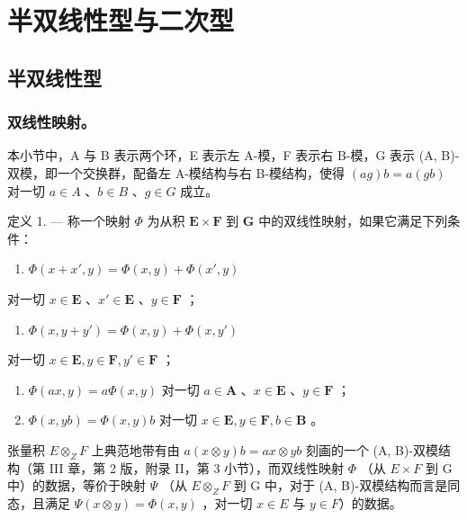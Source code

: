 \chapter{半双线性型与二次型}

\section{半双线性型}

\subsection{双线性映射。}

本小节中，A 与 B 表示两个环，E 表示左 A-模，F 表示右 B-模，G 表示 (A, B)-双模，即一个交换群，配备左 A-模结构与右 B-模结构，使得 \((ag)b = a(gb)\) 对一切 \(a \in A\) 、\(b \in B\) 、\(g \in G\) 成立。

定义 1. --- 称一个映射 \(\Phi\) 为从积 \(\mathbf{E} \times \mathbf{F}\) 到 \(\mathbf{G}\) 中的双线性映射，如果它满足下列条件：

\begin{enumerate}
\def\labelenumi{(\arabic{enumi})}
\tightlist
\item
  \(\Phi(x + x', y) = \Phi(x, y) + \Phi(x', y)\)
\end{enumerate}

对一切 \(x \in \mathbf{E}\) 、\(x' \in \mathbf{E}\) 、\(y \in \mathbf{F}\) ；

\begin{enumerate}
\def\labelenumi{(\arabic{enumi})}
\setcounter{enumi}{1}
\tightlist
\item
  \(\Phi(x, y + y') = \Phi(x, y) + \Phi(x, y')\)
\end{enumerate}

对一切 \(x \in \mathbf{E}, y \in \mathbf{F}, y' \in \mathbf{F}\) ；

\begin{enumerate}
\def\labelenumi{(\arabic{enumi})}
\setcounter{enumi}{2}
\item
  \(\Phi(ax, y) = a\Phi(x, y)\) 对一切 \(a \in \mathbf{A}\) 、\(x \in \mathbf{E}\) 、\(y \in \mathbf{F}\) ；
\item
  \(\Phi(x, yb) = \Phi(x, y)b\) 对一切 \(x \in \mathbf{E}, y \in \mathbf{F}, b \in \mathbf{B}\) 。
\end{enumerate}

张量积 \(E \otimes_{Z} F\) 上典范地带有由 \(a(x \otimes y)b = ax \otimes yb\) 刻画的一个 (A, B)-双模结构（第 III 章，第 2 版，附录 II，第 3 小节），而双线性映射 \(\Phi\) （从 \(E \times F\) 到 G 中）的数据，等价于映射 \(\Psi\) （从 \(E \otimes_{Z} F\) 到 G 中，对于 (A, B)-双模结构而言是同态，且满足 \(\Psi(x \otimes y) = \Phi(x, y)\) ，对一切 \(x \in E\) 与 \(y \in F\)）的数据。

